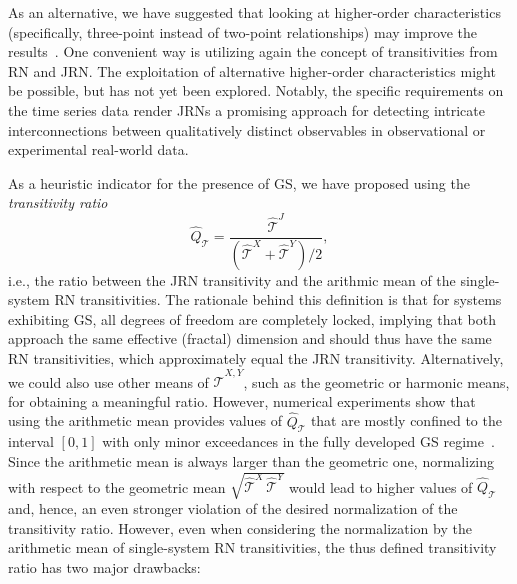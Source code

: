 As an alternative, we have suggested that looking at higher-order characteristics (specifically, three-point instead of two-point relationships) may improve the results~\cite{Feldhoff2013}. %
One convenient way is utilizing again the concept of transitivities from RN and JRN. The exploitation of alternative higher-order characteristics might be possible, but has not yet been explored.
Notably, the specific requirements on the time series data render JRNs a promising approach for detecting intricate interconnections between qualitatively distinct observables in observational or experimental real-world data. 

As a heuristic indicator for the presence of GS, we have proposed using the \emph{transitivity ratio}~\cite{Feldhoff2013} 
\begin{equation}
\hat{Q}_{\mathcal{T}}=\frac{\hat{\mathcal{T}}^J}{(\hat{\mathcal{T}}^X+\hat{\mathcal{T}}^Y)/2}, 
\label{eq:qt}
\end{equation}
\noindent
i.e., the ratio between the JRN transitivity and the arithmic mean of the single-system RN transitivities. The rationale behind this definition is that for systems exhibiting GS, all degrees of freedom are completely locked, implying that both approach the same effective (fractal) dimension and should thus have the same RN transitivities, which approximately equal the JRN transitivity. Alternatively, we could also use other means of $\hat{\mathcal{T}}^{X,Y}$, such as the geometric or harmonic means, for obtaining a meaningful ratio. However, numerical experiments show that using the arithmetic mean provides values of $\hat{Q}_{\mathcal{T}}$ that are mostly confined to the interval $[0,1]$ with only minor exceedances in the fully developed GS regime~\cite{Feldhoff2013}. Since the arithmetic mean is always larger than the geometric one, normalizing with respect to the geometric mean $\sqrt{\hat{\mathcal{T}}^X\, \hat{\mathcal{T}}^Y}$ would lead to higher values of $\hat{Q}_{\mathcal{T}}$ and, hence, an even stronger violation of the desired normalization of the transitivity ratio. However, even when considering the normalization by the arithmetic mean of single-system RN transitivities, the thus defined transitivity ratio has two major drawbacks: 

